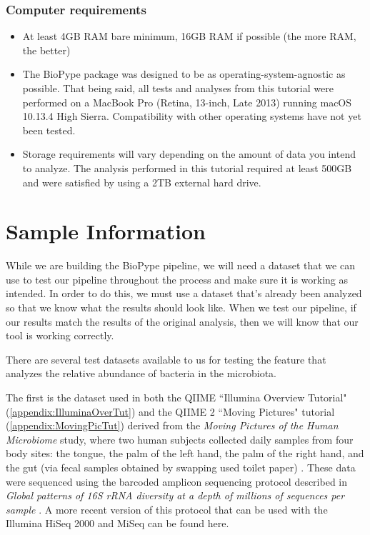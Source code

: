 \subsection*{Computer requirements}
\begin{itemize}
    \item At least 4GB RAM bare minimum, 16GB RAM if possible (the more RAM, the better)
    \item The BioPype package was designed to be as operating-system-agnostic as possible. That being said, all tests and analyses from this tutorial were performed on a MacBook Pro (Retina, 13-inch, Late 2013) running macOS 10.13.4 High Sierra. Compatibility with other operating systems have not yet been tested.
    \item Storage requirements will vary depending on the amount of data you intend to analyze. The analysis performed in this tutorial required at least 500GB and were satisfied by using a 2TB external hard drive.
\end{itemize}


%
\chapter{Sample Information}

While we are building the BioPype pipeline, we will need a dataset that we can use to test our pipeline throughout the process and make sure it is working as intended. In order to do this, we must use a dataset that's already been analyzed so that we know what the results should look like. When we test our pipeline, if our results match the results of the original analysis, then we will know that our tool is working correctly.

There are several test datasets available to us for testing the feature that analyzes the relative abundance of bacteria in the microbiota.

The first is the dataset used in both the QIIME ``Illumina Overview Tutorial" (\ref{appendix:IlluminaOverTut})  and the QIIME 2 ``Moving Pictures" tutorial (\ref{appendix:MovingPicTut}) derived from the \textit{Moving Pictures of the Human Microbiome} study, where two human subjects collected daily samples from four body sites: the tongue, the palm of the left hand, the palm of the right hand, and the gut (via fecal samples obtained by swapping used toilet paper) \cite{Caporaso2011}. These data were sequenced using the barcoded amplicon sequencing protocol described in \textit{Global patterns of 16S rRNA diversity at a depth of millions of sequences per sample} \cite{Caporaso2011a}. A more recent version of this protocol that can be used with the Illumina HiSeq 2000 and MiSeq can be found here.

